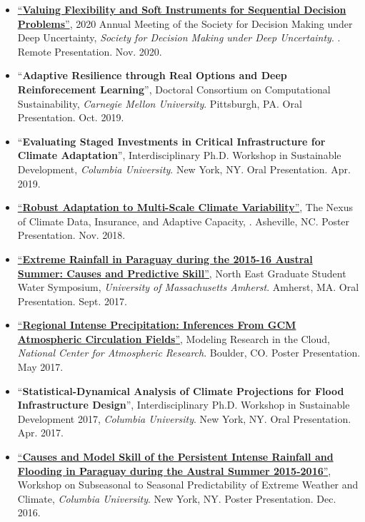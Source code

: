 \documentclass[10pt,oneside]{article}
\begin{document}
\begin{itemize}[label={}]
  
  \item \href{https://2020.deepuncertainty.org/program}{\enquote{\textbf{Valuing Flexibility and Soft Instruments for Sequential Decision Problems}}}, 2020 Annual Meeting of the Society for Decision Making under Deep Uncertainty,  \textit{Society for Decision Making under Deep Uncertainty}. . Remote Presentation. Nov. 2020.
        
  \item \enquote{\textbf{Adaptive Resilience through Real Options and Deep Reinforecement Learning}}, Doctoral Consortium on Computational Sustainability,  \textit{Carnegie Mellon University}. Pittsburgh,  PA. Oral Presentation. Oct. 2019.
        
  \item \enquote{\textbf{Evaluating Staged Investments in Critical Infrastructure for Climate Adaptation}}, Interdisciplinary Ph.D. Workshop in Sustainable Development,  \textit{Columbia University}. New York, NY. Oral Presentation. Apr. 2019.
        
  \item \href{https://doi.org/10.6084/m9.figshare.8277002.v1}{\enquote{\textbf{Robust Adaptation to Multi-Scale Climate Variability}}}, The Nexus of Climate Data, Insurance, and Adaptive Capacity,  \textit{}. Asheville, NC. Poster Presentation. Nov. 2018.
        
  \item \href{https://doi.org/10.6084/m9.figshare.8277128.v2}{\enquote{\textbf{Extreme Rainfall in Paraguay during the 2015-16 Austral Summer: Causes and Predictive Skill}}}, North East Graduate Student Water Symposium,  \textit{University of Massachusetts Amherst}. Amherst, MA. Oral Presentation. Sept. 2017.
        
  \item \href{https://doi.org/10.6084/m9.figshare.8277167.v1}{\enquote{\textbf{Regional Intense Precipitation: Inferences From GCM Atmospheric Circulation Fields}}}, Modeling Research in the Cloud,  \textit{National Center for Atmospheric Research}. Boulder, CO. Poster Presentation. May 2017.
        
  \item \enquote{\textbf{Statistical-Dynamical Analysis of Climate Projections for Flood Infrastructure Design}}, Interdisciplinary Ph.D. Workshop in Sustainable Development 2017,  \textit{Columbia University}. New York, NY. Oral Presentation. Apr. 2017.
        
  \item \href{https://doi.org/10.13140/RG.2.2.20146.30406}{\enquote{\textbf{Causes and Model Skill of the Persistent Intense Rainfall and Flooding in Paraguay during the Austral Summer 2015-2016}}}, Workshop on Subseasonal to Seasonal Predictability of Extreme Weather and Climate,  \textit{Columbia University}. New York, NY. Poster Presentation. Dec. 2016.
        
\end{itemize}
\end{document}
